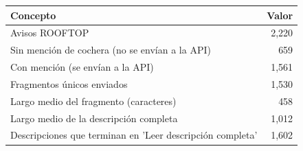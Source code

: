 \begin{tabular}{lr}
\toprule
Concepto & Valor \\
\midrule
Avisos ROOFTOP & 2,220 \\
Sin mención de cochera (no se envían a la API) & 659 \\
Con mención (se envían a la API) & 1,561 \\
Fragmentos únicos enviados & 1,530 \\
Largo medio del fragmento (caracteres) & 458 \\
Largo medio de la descripción completa & 1,012 \\
Descripciones que terminan en 'Leer descripción completa' & 1,602 \\
\bottomrule
\end{tabular}